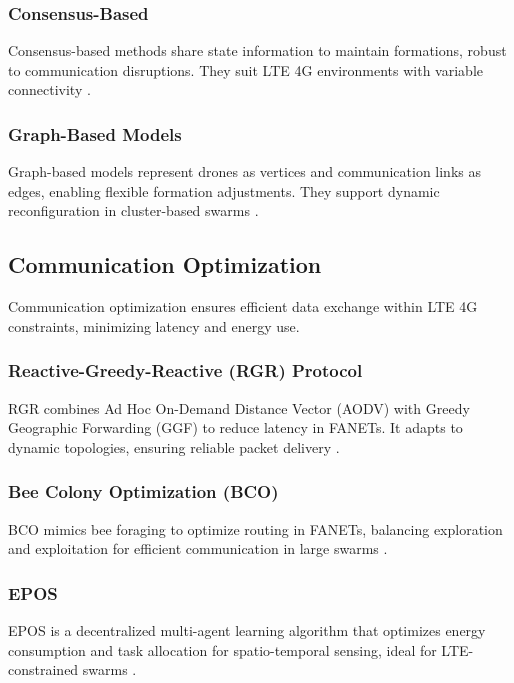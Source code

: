 \documentclass{article}
\begin{document}
\subsubsection{Consensus-Based}
Consensus-based methods share state information to maintain formations, robust to communication disruptions. They suit LTE 4G environments with variable connectivity \cite{Ren2007b, Dong2016}.

\subsubsection{Graph-Based Models}
Graph-based models represent drones as vertices and communication links as edges, enabling flexible formation adjustments. They support dynamic reconfiguration in cluster-based swarms \cite{Zavlanos2007, Mesbahi2010}.

\subsection{Communication Optimization}
Communication optimization ensures efficient data exchange within LTE 4G constraints, minimizing latency and energy use.

\subsubsection{Reactive-Greedy-Reactive (RGR) Protocol}
RGR combines Ad Hoc On-Demand Distance Vector (AODV) with Greedy Geographic Forwarding (GGF) to reduce latency in FANETs. It adapts to dynamic topologies, ensuring reliable packet delivery \cite{Li2016, Zhang2018b}.

\subsubsection{Bee Colony Optimization (BCO)}
BCO mimics bee foraging to optimize routing in FANETs, balancing exploration and exploitation for efficient communication in large swarms \cite{Bitencourt2016, Karaboga2012}.

\subsubsection{EPOS}
EPOS is a decentralized multi-agent learning algorithm that optimizes energy consumption and task allocation for spatio-temporal sensing, ideal for LTE-constrained swarms \cite{Chen2019, Liu2021}.
\end{document}
